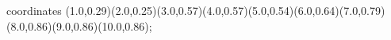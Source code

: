 					coordinates { (1.0,0.29)(2.0,0.25)(3.0,0.57)(4.0,0.57)(5.0,0.54)(6.0,0.64)(7.0,0.79)(8.0,0.86)(9.0,0.86)(10.0,0.86)};